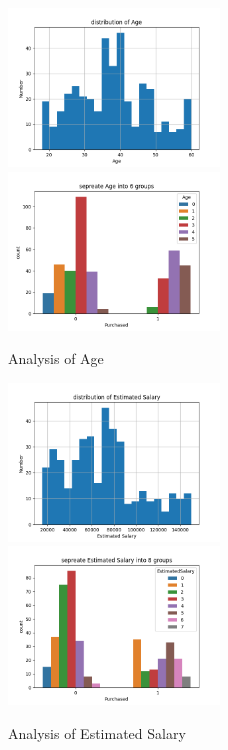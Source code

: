 \begin{figure}[htbp]
  \includegraphics[width=0.5\textwidth]{../image/age_distribution.png}
  \includegraphics[width=0.5\textwidth]{../image/seperated_age.png}
  \caption{Analysis of Age}  
\label{fig:age}
\end{figure}

\begin{figure}[htbp]
  \includegraphics[width=0.5\textwidth]{../image/salary_distribution.png}
  \includegraphics[width=0.5\textwidth]{../image/seperated_salary.png}
  \caption{Analysis of Estimated Salary}  
\label{fig:salary}
\end{figure}

